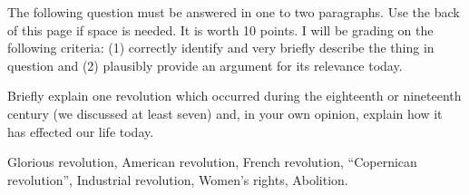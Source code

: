 \documentclass[12pt]{examdesign}
\begin{document}
\pagebreak
\begin{shortanswer}[title={Short Essay}]
	The following question must be answered in one to two paragraphs. Use the back of this page if space is needed. It is worth 10 points. I will be grading on the following criteria: (1) correctly identify and very briefly describe the thing in question and (2) plausibly provide an argument for its relevance today.

	\begin{question}
		Briefly explain one revolution which occurred during the eighteenth or nineteenth century (we discussed at least seven) and, in your own opinion, explain how it has effected our life today.
		\examvspace{5 in}
		\begin{answer}
			Glorious revolution, American revolution, French revolution, ``Copernican revolution'', Industrial revolution, Women's rights, Abolition.
		\end{answer}
	\end{question}
\end{shortanswer}
\end{document}
